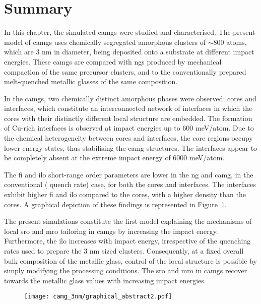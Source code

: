 \section{Summary}
\begin{changebar}
In this chapter, the simulated \cz \gls{camg}s were studied and characterised. The present model of \gls{camg}s uses chemically segregated amorphous \cz clusters of $\sim$800 atoms, which are 3 nm in diameter, being deposited onto a substrate at different impact energies. These \gls{camg}s are compared with \gls{ng}s produced by mechanical compaction of the same precursor clusters, and to the conventionally prepared melt-quenched metallic glasses of the same composition. \par

In the \gls{camg}s, two chemically distinct amorphous phases were observed: cores and interfaces, which constitute an interconnected network of interfaces in which the cores with their distinctly different local structure are embedded. The formation of Cu-rich interfaces is observed at impact energies up to 600 meV/atom. Due to the chemical heterogeneity between cores and interfaces, the core regions occupy lower energy states, thus stabilising the \gls{camg} structures. The interfaces appear to be completely absent at the extreme impact energy of 6000 meV/atom. \par

The \gls{fi} and \gls{ilo} short-range order parameters are lower in the \gls{ng} and \gls{camg}, in the conventional ( quench rate) case, for both the cores and interfaces. The interfaces exhibit higher \gls{fi} and \gls{ilo} compared to the cores, with a higher density than the cores. A graphical depiction of these findings is represented in Figure~\ref{f:camg-summary}. \par

The present simulations constitute the first model explaining the mechanisms of local \gls{sro} and \gls{mro} tailoring in \gls{camg}s by increasing the impact energy. Furthermore, the \gls{ilo} increases with impact energy, irrespective of the quenching rates used to prepare the 3 nm sized clusters. Consequently, at a fixed overall bulk composition of the metallic glass, control of the local structure is possible by simply modifying the processing conditions. The \gls{sro} and \gls{mro} in \gls{camg}s recover towards the metallic glass values with increasing impact energies.


\begin{figure}
	\texttt{[image: camg\_3nm/graphical\_abstract2.pdf]}
	\label{f:camg-summary}
\end{figure}
\end{changebar}